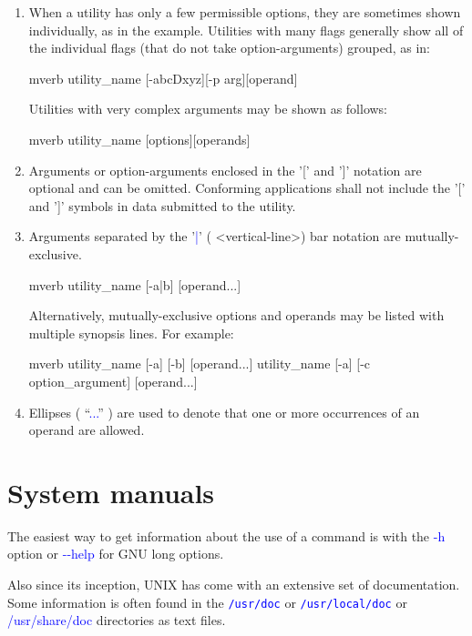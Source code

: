 \documentclass[12pt]{report}
\newcommand{\struct}[1]{\textcolor{blue}{#1}}
\newcommand{\cmd}[1]{\textcolor{blue}{\tt #1}}
\begin{document}
\begin{enumerate}
In GNU getopt's long options also may be used the 'equal' sign between
option and option-argument:
\begin{code}{mverb}
utility_name --option argument --option=argument
\end{code}
\item When a utility has only a few permissible options, they are
sometimes shown individually, as in the example. Utilities with many
flags generally show all of the individual flags (that do not take
option-arguments) grouped, as in:
\begin{code}{mverb}
utility_name [-abcDxyz][-p arg][operand]
\end{code}
Utilities with very complex arguments may be shown as follows:
\begin{code}{mverb}
utility_name [options][operands]
\end{code}
\item Arguments or option-arguments enclosed in the '[' and ']'
notation are optional and can be omitted. Conforming applications shall
not include the '[' and ']' symbols in data submitted to the utility.
\item Arguments separated by the '\struct{|}' ( <vertical-line>) bar notation
are mutually-exclusive.
\begin{code}{mverb}
utility_name [-a|b] [operand...]
\end{code}
Alternatively, mutually-exclusive options and operands may be listed with
multiple synopsis lines. For example:
\begin{code}{mverb}
utility_name [-a] [-b] [operand...]
utility_name [-a] [-c option_argument] [operand...]
\end{code}
\item Ellipses ( ``\struct{...}'' ) are used to denote that one or more
occurrences of an operand are allowed.
\end{enumerate}

\section*{System manuals}

The easiest way to get information about the use of a command is with
the \struct{-h} option or \struct{-\mbox{}-help} for GNU long options.

Also since its inception, UNIX has come with an extensive set of
documentation. Some information is often found in the \cmd{/usr/doc} or
\cmd{/usr/local/doc} or \struct{/usr/share/doc} directories as text files.
\end{document}
